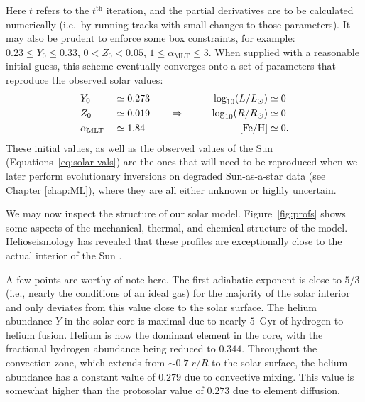 Here $t$ refers to the $t^{\text{th}}$ iteration, and the partial derivatives are to be calculated numerically (i.e.\ by running tracks with small changes to those parameters). 
It may also be prudent to enforce some box constraints, for example: ${0.23 \leq Y_0 \leq 0.33}$, ${0 < Z_0 < 0.05}$, ${1 \leq \alpha_{\text{MLT}} \leq 3}$. 
When supplied with a reasonable initial guess, this scheme eventually converges onto a set of parameters that reproduce the observed solar values: 
\begin{alignat}{3} \label{eq:solar-cal-vals} 
    &Y_0 &&\simeq 0.273  &\log_{10}(L/L_\odot) &\simeq 0 \notag\\
    &Z_0 &&\simeq 0.019 \qquad\Rightarrow\qquad &\log_{10}(R/R_\odot) &\simeq 0\\\notag
    &\alpha_{\text{MLT}} &&\simeq 1.84  &\text{[Fe/H]} &\simeq 0.
\end{alignat}
These initial values, as well as the observed values of the Sun (Equations~\ref{eq:solar-vals}) are the ones that will need to be reproduced when we later perform evolutionary inversions on degraded Sun-as-a-star data (see Chapter \ref{chap:ML}), where they are all either unknown or highly uncertain. 

We may now inspect the structure of our solar model. 
Figure~\ref{fig:profs} shows some aspects of the mechanical, thermal, and chemical structure of the model. 
Helioseismology has revealed that these profiles are exceptionally close to the actual interior of the Sun \citep[see, e.g.,][]{2016lrsp...13....2b}. 

A few points are worthy of note here. 
The first adiabatic exponent is close to ${5/3}$ (i.e., nearly the conditions of an ideal gas) for the majority of the solar interior and only deviates from this value close to the solar surface. 
The helium abundance $Y$ in the solar core is maximal due to nearly $5$~Gyr of hydrogen-to-helium fusion. 
Helium is now the dominant element in the core, with the fractional hydrogen abundance being reduced to $0.344$. 
Throughout the convection zone, which extends from ${\sim 0.7\;{r/R}}$ to the solar surface, the helium abundance has a constant value of $0.279$ due to convective mixing. 
This value is somewhat higher than the protosolar value of $0.273$ due to element diffusion. 

